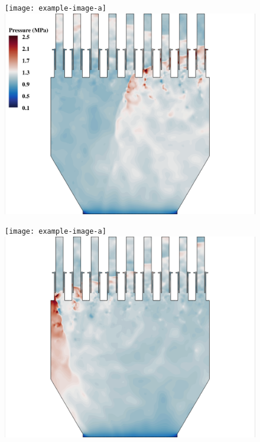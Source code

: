 \begin{figure}
	\begin{minipage}{0.49\linewidth}
		\ifdefined\DRAFT
			\texttt{[image: example-image-a]}
		\else
			\includegraphics[width=0.99\linewidth,trim={0.5em 0em 6cm 0em},clip]{Chapters/HPROMResults/Images/nineElem/example_snaps/example_pressure_z.png}
		\fi
	\end{minipage}
	\begin{minipage}{0.49\linewidth}
		\ifdefined\DRAFT
			\texttt{[image: example-image-a]}
		\else
			\includegraphics[width=0.99\linewidth,trim={6cm 0em 0.5em 0em},clip]{Chapters/HPROMResults/Images/nineElem/example_snaps/example_pressure_z_216000.png}
		\fi
	\end{minipage}


\end{figure}
